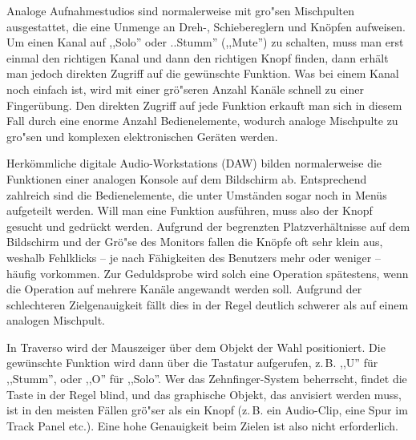Analoge Aufnahmestudios sind normalerweise mit gro"sen Mischpulten ausgestattet, die eine Unmenge an Dreh-, Schiebereglern und Knöpfen aufweisen. Um einen Kanal auf ,,Solo'' oder ..Stumm'' (,,Mute'') zu schalten, muss man erst einmal den richtigen Kanal und dann den richtigen Knopf finden, dann erhält man jedoch direkten Zugriff auf die gewünschte Funktion. Was bei einem Kanal noch einfach ist, wird mit einer grö"seren Anzahl Kanäle schnell zu einer Fingerübung. Den direkten Zugriff auf jede Funktion erkauft man sich in diesem Fall durch eine enorme Anzahl Bedienelemente, wodurch analoge Mischpulte zu gro"sen und komplexen elektronischen Geräten werden.

Herkömmliche digitale Audio-Workstations (DAW) bilden normalerweise die Funktionen einer analogen Konsole auf dem Bildschirm ab. Entsprechend zahlreich sind die Bedienelemente, die unter Umständen sogar noch in Menüs aufgeteilt werden. Will man eine Funktion ausführen, muss also der Knopf gesucht und gedrückt werden. Aufgrund der begrenzten Platzverhältnisse auf dem Bildschirm und der Grö"se des Monitors fallen die Knöpfe oft sehr klein aus, weshalb Fehlklicks -- je nach Fähigkeiten des Benutzers mehr oder weniger -- häufig vorkommen. Zur Geduldsprobe wird solch eine Operation spätestens, wenn die Operation auf mehrere Kanäle angewandt werden soll. Aufgrund der schlechteren Zielgenauigkeit fällt dies in der Regel deutlich schwerer als auf einem analogen Mischpult.

In Traverso wird der Mauszeiger über dem Objekt der Wahl positioniert. Die gewünschte Funktion wird dann über die Tastatur aufgerufen, z.\,B. ,,U'' für ,,Stumm'', oder ,,O'' für ,,Solo''. Wer das Zehnfinger-System beherrscht, findet die Taste in der Regel blind, und das graphische Objekt, das anvisiert werden muss, ist in den meisten Fällen grö"ser als ein Knopf (z.\,B. ein Audio-Clip, eine Spur im Track Panel etc.). Eine hohe Genauigkeit beim Zielen ist also nicht erforderlich.

